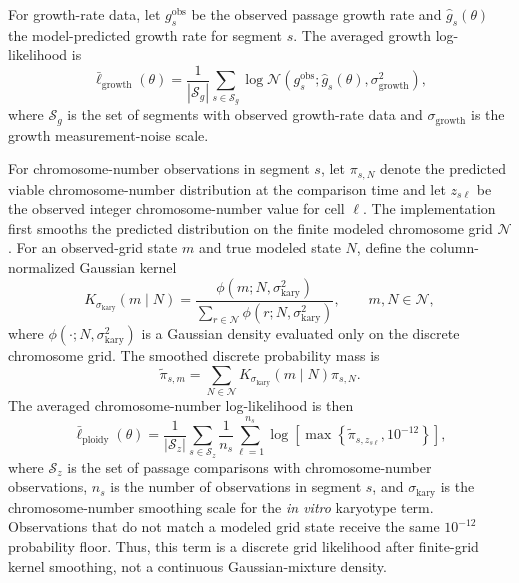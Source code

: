 \documentclass[11pt]{article}
\begin{document}
For growth-rate data, let $g_s^{\mathrm{obs}}$ be the observed passage growth rate and $\widehat g_s(\theta)$ the model-predicted growth rate for segment $s$. The averaged growth log-likelihood is
\begin{equation}
\bar\ell_{\mathrm{growth}}(\theta)
=
\frac{1}{|\mathcal S_g|}
\sum_{s\in\mathcal S_g}
\log \mathcal N\!\left(g_s^{\mathrm{obs}};\widehat g_s(\theta),\sigma_{\mathrm{growth}}^2\right),
\label{eq:appendix_invitro_growth_ll}
\end{equation}
where $\mathcal S_g$ is the set of segments with observed growth-rate data and $\sigma_{\mathrm{growth}}$ is the growth measurement-noise scale.

For chromosome-number observations in segment $s$, let $\pi_{s,N}$ denote the predicted viable chromosome-number distribution at the comparison time and let $z_{s\ell}$ be the observed integer chromosome-number value for cell $\ell$. The implementation first smooths the predicted distribution on the finite modeled chromosome grid $\mathcal N$. For an observed-grid state $m$ and true modeled state $N$, define the column-normalized Gaussian kernel
\begin{equation}
K_{\sigma_{\mathrm{kary}}}(m\mid N)
=
\frac{
\phi\!\left(m;N,\sigma_{\mathrm{kary}}^2\right)
}{
\displaystyle\sum_{r\in\mathcal N}
\phi\!\left(r;N,\sigma_{\mathrm{kary}}^2\right)
},
\qquad m,N\in\mathcal N,
\label{eq:appendix_invitro_kary_kernel}
\end{equation}
where $\phi(\cdot;N,\sigma_{\mathrm{kary}}^2)$ is a Gaussian density evaluated only on the discrete chromosome grid. The smoothed discrete probability mass is
\begin{equation}
\widetilde\pi_{s,m}
=
\sum_{N\in\mathcal N}
K_{\sigma_{\mathrm{kary}}}(m\mid N)\pi_{s,N}.
\label{eq:appendix_invitro_smoothed_kary_mass}
\end{equation}
The averaged chromosome-number log-likelihood is then
\begin{equation}
\bar\ell_{\mathrm{ploidy}}(\theta)
=
\frac{1}{|\mathcal S_z|}
\sum_{s\in\mathcal S_z}
\frac{1}{n_s}
\sum_{\ell=1}^{n_s}
\log\left[
\max\left\{
\widetilde\pi_{s,z_{s\ell}},10^{-12}
\right\}
\right],
\label{eq:appendix_invitro_ploidy_ll}
\end{equation}
where $\mathcal S_z$ is the set of passage comparisons with chromosome-number observations, $n_s$ is the number of observations in segment $s$, and $\sigma_{\mathrm{kary}}$ is the chromosome-number smoothing scale for the \textit{in vitro} karyotype term. Observations that do not match a modeled grid state receive the same $10^{-12}$ probability floor. Thus, this term is a discrete grid likelihood after finite-grid kernel smoothing, not a continuous Gaussian-mixture density.
\end{document}
